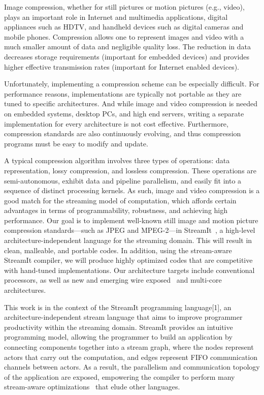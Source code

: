 
Image compression, whether for still pictures or motion pictures
(e.g., video), plays an important role in Internet and multimedia
applications, digital appliances such as HDTV, and handheld devices
such as digital cameras and mobile phones. Compression allows one to
represent images and video with a much smaller amount of data and
negligible quality loss. The reduction in data decreases storage
requirements (important for embedded devices) and provides higher
effective transmission rates (important for Internet enabled devices).

Unfortunately, implementing a compression scheme can be especially
difficult. For performance reasons, implementations are typically not
portable as they are tuned to specific architectures. And while image
and video compression is needed on embedded systems, desktop PCs, and
high end servers, writing a separate implementation for every
architecture is not cost effective. Furthermore, compression standards
are also continuously evolving, and thus compression programs must be
easy to modify and update.

A typical compression algorithm involves three types of operations:
data representation, lossy compression, and lossless
compression. These operations are semi-autonomous, exhibit data and
pipeline parallelism, and easily fit into a sequence of distinct
processing kernels. As such, image and video compression is a good
match for the streaming model of computation, which affords certain
advantages in terms of programmability, robustness, and achieving high
performance. Our goal is to implement well-known still image and
motion picture compression standards---such as JPEG and MPEG-2---in
StreamIt~\cite{streamitcc}, a high-level architecture-independent
language for the streaming domain. This will result in clean,
malleable, and portable codes.
In addition, using the stream-aware StreamIt compiler, we will produce
highly optimized codes that are competitive with hand-tuned
implementations. Our architecture targets include conventional
processors, as well as new and emerging wire
exposed~\cite{raw02ieee,raw04isca} and multi-core architectures.

This work is in the context of the StreamIt programming language[1],
an architecture-independent stream language that aims to improve
programmer productivity within the streaming domain. StreamIt provides
an intuitive programming model, allowing the programmer to build an
application by connecting components together into a stream graph,
where the nodes represent actors that carry out the computation, and
edges represent FIFO communication channels between actors. As a
result, the parallelism and communication topology of the application
are exposed, empowering the compiler to perform many stream-aware
optimizations~\cite{lamb03pldi,agrawal05cases,sermulins05lctes,gordon02asplos}
that elude other languages.

